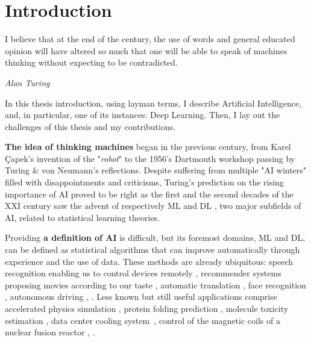 \chapter{Introduction}
\label{chapter:introduction}

{}





\epigraph{I believe that at the end of the century, the use of words and general educated opinion
      will have altered so much that one will be able to speak of machines thinking without expecting to
      be contradicted.}{\textit{Alan Turing}}

In this thesis introduction, using layman terms, I describe Artificial Intelligence, and,
in particular, one of its instances: Deep Learning. Then, I lay out the challenges of this
thesis and my contributions.


\textbf{The idea of thinking machines} began in the previous century, from Karel Çapek's invention
of the "\textit{robot}" to the 1956's Dartmouth workshop passing by Turing \& von Neumann's
reflections. Despite suffering from multiple "AI winters" filled with disappointments and
criticisms, Turing's prediction on the rising importance of \ac{AI} proved to be right as the first
and the second decades of the XXI century saw the advent of respectively \acf{ML}
\citep{bishop2006prml} and \acf{DL} \citep{goodfellow2016deeplearningbook}, two major subfields of
\ac{AI}, related to statistical learning theories.

Providing \textbf{a definition of \ac{AI}} is difficult, but its foremost domains, \ac{ML} and
\ac{DL}, can be defined as statistical algorithms that can improve automatically through experience
and the use of data. These methods are already ubiquitous: speech recognition enabling us to control
devices remotely \citep{amodei2016deepspeech2}, recommender systems proposing movies according to
our taste \citep{toscher2009netflixprize}, automatic translation \citep{vaswani2017transformer},
face recognition \citep{schroff2015facenet}, autonomous driving \citep{sun2020waymodataset}, \etc.
Less known but still useful applications comprise accelerated physics simulation
\citep{breen2020threebody}, protein folding prediction \citep{jumper2021alphafold}, molecule
toxicity estimation \citep{nih2019toxchallenge}, data center cooling
system \citep{evans2016datacentercooling}, control of the magnetic coils of a nuclear fusion reactor
\citep{degrave2022nuclearreactor}, \etc.

